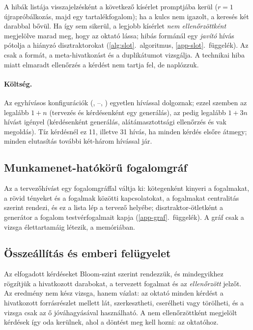 A hibák listája visszajelzésként a következő kísérlet promptjába kerül ($r=1$ újrapróbálkozás, majd egy
tartalékfogalom); ha a kulcs nem igazolt, a keresés két darabbal bővül. Ha így sem sikerül, a legjobb
kísérlet \emph{nem ellenőrzöttként} megjelölve marad meg, hogy az oktató lássa; hibás formánál egy
\emph{javító} hívás pótolja a hiányzó disztraktorokat (\ref{alg:slot}.~algoritmus,
\ref{app-slot}.~függelék). Az  csak a formát, a meta-hivatkozást és a duplikátumot vizsgálja. A
technikai hiba miatt elmaradt ellenőrzés a kérdést nem tartja fel, de naplózzuk.

\paragraph{Költség.} Az egyhívásos konfigurációk (, --, ) egyetlen
hívással dolgoznak; ezzel szemben az  legalább $1+n$ (tervezés és kérdésenként egy generálás), az  pedig
legalább $1+3n$ hívást igényel (kérdésenként generálás, alátámasztottsági ellenőrzés és vak megoldás). Tíz
kérdésnél ez 11, illetve 31 hívás, ha minden kérdés elsőre átmegy; minden elutasítás további két-három
hívással jár.

\subsection{Munkamenet-hatókörű fogalomgráf}
\label{sec:graf}

Az  a tervezőhívást egy fogalomgráffal váltja ki: kötegenként kinyeri a fogalmakat, a rövid
tényeket és a fogalmak közötti kapcsolatokat, a fogalmakat centralitás szerint rendezi, és ez a lista lép
a tervező helyébe; disztraktor-ötletként a generátor a fogalom testvérfogalmait kapja
(\ref{app-graf}.~függelék). A gráf csak a vizsga élettartamáig létezik, a memóriában.

\subsection{Összeállítás és emberi felügyelet}
\label{sec:felugyelet}

Az elfogadott kérdéseket Bloom-szint szerint rendezzük, és mindegyikhez rögzítjük a hivatkozott
darabokat, a tervezett fogalmat és az \emph{ellenőrzött} jelzőt. Az eredmény nem kész vizsga, hanem
vázlat: az oktató minden kérdést a hivatkozott forrásrészlet mellett lát, szerkesztheti, cserélheti vagy
törölheti, és a vizsga csak az ő jóváhagyásával használható. A nem ellenőrzöttként megjelölt kérdések
így oda kerülnek, ahol a döntést meg kell hozni: az oktatóhoz.

